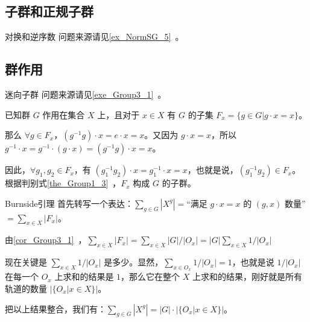 
\subsection{子群和正规子群}

\begin{example}{对换和逆序数}\label{ex_GroupP_1}
问题来源请见\autoref{ex_NormSG_5}~。



\end{example}

\subsection{群作用}

\begin{example}{迷向子群}\label{ex_GroupP_2}
问题来源请见\autoref{exe_Group3_1}~。

已知群 $G$ 作用在集合 $X$ 上，且对于 $x\in X$ 有 $G$ 的子集 $F_x=\{g\in G|g\cdot x=x\}$。

那么 $\forall g\in F_x$，$(g^{-1}g)\cdot x=e\cdot x=x$。又因为 $g\cdot x=x$，所以 $g^{-1}\cdot x=g^{-1}\cdot(g\cdot x)=(g^{-1}g)\cdot x=x$。

因此，$\forall g_1, g_2\in F_x$，有 $(g_1^{-1}g_2)\cdot x=g_1^{-1}\cdot x=x$，也就是说，$(g_1^{-1}g_2)\in F_x$。根据判别式\autoref{the_Group1_3}~，$F_x$ 构成 $G$ 的子群。

\end{example}

\begin{example}{Burnside引理}\label{ex_GroupP_3}
首先转写一个表达：$\sum_{g\in G}|X^g|=$“满足 $g\cdot x=x$ 的 $(g, x)$ 数量”$=\sum_{x\in X}|F_x|$。

由\autoref{cor_Group3_1}~，$\sum_{x\in X}|F_x|=\sum_{x\in X} |G|/|O_x|=|G| \sum_{x\in X} 1/|O_x|$

现在关键是 $\sum_{x\in X} 1/|O_x|$ 是多少。显然，$\sum_{x\in O_x} 1/|O_x|=1$，也就是说 $1/|O_x|$ 在每一个 $O_x$ 上求和的结果是 $1$，那么它在整个 $X$ 上求和的结果，刚好就是所有轨道的数量 $|\{O_x|x\in X\}|$。

把以上结果整合，我们有：$\sum_{g\in G}|X^g|=|G|\cdot|\{O_x|x\in X\}|$。
\end{example}

